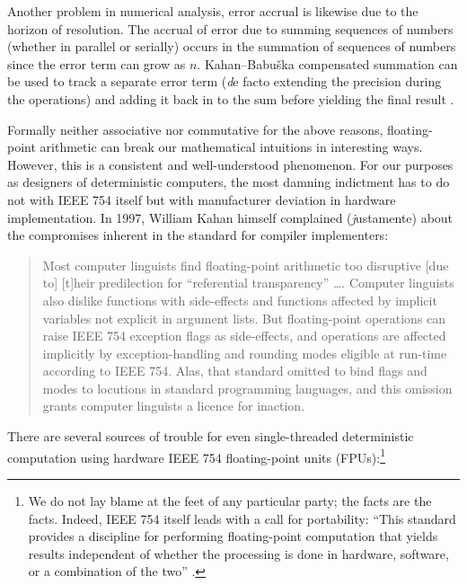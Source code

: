 \documentclass[twoside]{article}
\begin{document}
Another problem in numerical analysis, error accrual is likewise due to the horizon of resolution.  The accrual of error due to summing sequences of numbers (whether in parallel or serially) occurs in the summation of sequences of numbers since the error term can grow as $n$.  Kahan–Babuška compensated summation can be used to track a separate error term ({\emph de facto} extending the precision during the operations) and adding it back in to the sum before yielding the final result \citep{Kahan1965,Babuska1969}.

Formally neither associative nor commutative for the above reasons, floating-point arithmetic can break our mathematical intuitions in interesting ways.  However, this is a consistent and well-understood phenomenon.  For our purposes as designers of deterministic computers, the most damning indictment has to do not with IEEE 754 itself but with manufacturer deviation in hardware implementation.  In 1997, William Kahan himself complained ({\emph justamente}) about the compromises inherent in the standard for compiler implementers:

\begin{quote}
Most computer linguists find floating-point arithmetic too disruptive [due to] [t]heir predilection for “referential transparency” ….  Computer linguists also dislike functions with side-effects and functions affected by implicit variables not explicit in argument lists. But floating-point operations can raise IEEE 754 exception flags as side-effects, and operations are affected implicitly by exception-handling and rounding modes eligible at run-time according to IEEE 754. Alas, that standard omitted to bind flags and modes to locutions in standard programming languages, and this omission grants computer linguists a licence for inaction.  \citep{Kahan1997}
\end{quote}

There are several sources of trouble for even single-threaded deterministic computation using hardware IEEE 754 floating-point units (FPUs):\footnote{We do not lay blame at the feet of any particular party; the facts are the facts.  Indeed, IEEE 754 itself leads with a call for portability:  “This standard provides a discipline for performing floating-point computation that yields results independent of whether the processing is done in hardware, software, or a combination of the two” \citep{IEEE2008}.}
\end{document}
